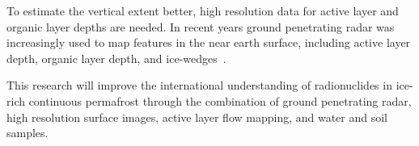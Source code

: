 To estimate the vertical extent better, high resolution data for active layer and organic layer depths are needed. 
In recent years ground penetrating radar was increasingly used to map features in the near earth surface, including active layer depth, organic layer depth, and ice-wedges~\citep{angelopoulosApplicationCCRGPR2013, guoDetectionPermafrostSubgrade2015, harrisUsingGroundPenetratingRadar2025, hinkelDetectionSubsurfacePermafrost2001, koyanPotential3DGPR2025, sudakovaUsingGroundPenetrating2021, sudakovaGroundPenetratingRadarStudies2019}.

This research will improve the international understanding of radionuclides in ice-rich continuous permafrost through the combination of ground penetrating radar, high resolution surface images, active layer flow mapping, and water and soil samples. 
